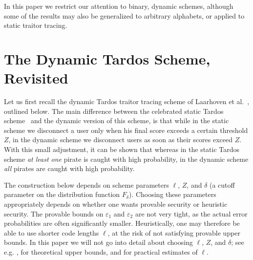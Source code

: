 \documentclass[10pt,a4paper,twocolumn]{article}
\newcommand{\eps}{\varepsilon}
\begin{document}
In this paper we restrict our attention to binary, dynamic schemes, although some of the results may also be generalized to arbitrary alphabets, or applied to static traitor tracing.




\section{The Dynamic Tardos Scheme, Revisited}
\label{sec:tardos}

Let us first recall the dynamic Tardos traitor tracing scheme of Laarhoven et al.~\cite{laarhoven13tit}, outlined below. The main difference between the celebrated static Tardos scheme~\cite{tardos03} and the dynamic version of this scheme, is that while in the static scheme we disconnect a user only when his final score exceeds a certain threshold $Z$, in the dynamic scheme we disconnect users as soon as their scores exceed $Z$. With this small adjustment, it can be shown that whereas in the static Tardos scheme \textit{at least one} pirate is caught with high probability, in the dynamic scheme \textit{all} pirates are caught with high probability.

The construction below depends on scheme parameters $\ell$, $Z$, and $\delta$ (a cutoff parameter on the distribution function $F_{\delta}$). Choosing these parameters appropriately depends on whether one wants provable security or heuristic security. The provable bounds on $\eps_1$ and $\eps_2$ are not very tight, as the actual error probabilities are often significantly smaller. Heuristically, one may therefore be able to use shorter code lengths $\ell$, at the risk of not satisfying provable upper bounds. In this paper we will not go into detail about choosing $\ell$, $Z$, and $\delta$; see e.g. \cite{laarhoven13tit}, \cite{blayer08,laarhoven12dcc,skoric13} for theoretical upper bounds, and \cite{furon09,simone12} for practical estimates of $\ell$.
\end{document}
